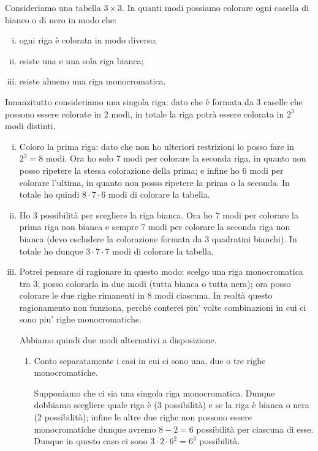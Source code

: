 \begin{example}
    Consideriamo una tabella $3 \times 3$. In quanti modi possiamo colorare ogni casella di bianco o di nero in modo che:
    \begin{enumerate}[(i)]
        \item ogni riga è colorata in modo diverso;
        \item esiste una e una sola riga bianca;
        \item esiste almeno una riga monocromatica.
    \end{enumerate}
\end{example}
\begin{solution}
    Innanzitutto consideriamo una singola riga: dato che è formata da $3$ caselle che possono essere colorate in 2 modi, in totale la riga potrà essere colorata in $2^3$ modi distinti.
    \begin{enumerate}
        [(i)]
        \item Coloro la prima riga: dato che non ho ulteriori restrizioni lo posso fare in $2^3 = 8$ modi. Ora ho solo 7 modi per colorare la seconda riga, in quanto non posso ripetere la stessa colorazione della prima; e infine ho 6 modi per colorare l'ultima, in quanto non posso ripetere la prima o la seconda. In totale ho quindi $8\cdot 7\cdot 6$ modi di colorare la tabella.
        \item Ho $3$ possibilità per scegliere la riga bianca. Ora ho $7$ modi per colorare la prima riga non bianca e sempre 7 modi per colorare la seconda riga non bianca (devo escludere la colorazione formata da 3 quadratini bianchi). In totale ho dunque $3 \cdot 7\cdot 7$ modi di colorare la tabella.
        \item Potrei pensare di ragionare in questo modo: scelgo una riga monocromatica tra 3; posso colorarla in due modi (tutta bianca o tutta nera); ora posso colorare le due righe rimanenti in 8 modi ciascuna. In realtà questo ragionamento non funziona, perché conterei piu' volte combinazioni in cui ci sono piu' righe monocromatiche.
        
        Abbiamo quindi due modi alternativi a disposizione. \begin{enumerate}[1.]
            \item Conto separatamente i casi in cui ci sono una, due o tre righe monocromatiche.
            
            Supponiamo che ci sia una singola riga monocromatica. Dunque dobbiamo scegliere quale riga è (3 possibilità) e se la riga è bianca o nera (2 possibilità); infine le altre due righe non possono essere monocromatiche dunque avremo $8-2 = 6$ possibilità per ciascuna di esse. Dunque in questo caso ci sono $3\cdot 2 \cdot 6^2 = 6^3$ possibilità.


\end{enumerate}
\end{enumerate}
\end{solution}
